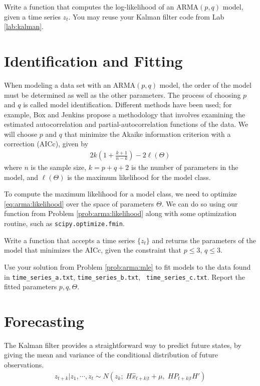 \begin{problem}
    \label{prob:arma:likelihood}
    Write a function that computes the log-likelihood of an $\text{ARMA}(p,q)$
    model, given a time series $z_t$. You may reuse your Kalman filter code
    from Lab \ref{lab:kalman}.
\end{problem}

\section*{Identification and Fitting}

When modeling a data set with an $\text{ARMA}(p,q)$ model, the order of the
model must be determined as well as the other parameters. The process of
choosing $p$ and $q$ is called model identification. Different methods have
been used; for example, Box and Jenkins propose a methodology that involves
examining the estimated autocorrelation and partial-autocorrelation functions
of the data. We will choose $p$ and $q$ that minimize the Akaike information
criterion with a correction (AICc), given by
\begin{align}
    2k\left(1 + \frac{k+1}{n-k}\right) - 2 \ell(\Theta)
\end{align}
where $n$ is the sample size, $k = p + q + 2$ is the number of parameters in
the model, and $\ell(\Theta)$ is the maximum likelihood for the model class.

To compute the maximum likelihood for a model class, we need to optimize
\ref{eq:arma:likelihood} over the space of parameters $\Theta$. We can do so
using our function from Problem \ref{prob:arma:likelihood} along with some
optimization routine, such as {\tt scipy.optimize.fmin}.

\begin{problem}
    \label{prob:arma:mle}
    Write a function that accepts a time series $\{z_t\}$ and returns the
    parameters of the model that minimizes the AICc, given the constraint that
    $p \leq 3$, $q \leq 3$.
\end{problem}

\begin{problem}
    Use your solution from Problem \ref{prob:arma:mle} to fit models to the
    data found in {\tt time\_series\_a.txt}, {\tt time\_series\_b.txt}, {\tt
    time\_series\_c.txt}. Report the fitted parameters $p, q, \Theta$.
\end{problem}

\section*{Forecasting}
The Kalman filter provides a straightforward way to predict future states, by
giving the mean and variance of the conditional distribution of future
observations.
\begin{align}
    z_{t + k} | z_{1}, \cdots, z_{t} \sim N(z_k;\; H\hat{x}_{t+k|t} + \mu,\;
    HP_{t+k|t}H')
\end{align}

